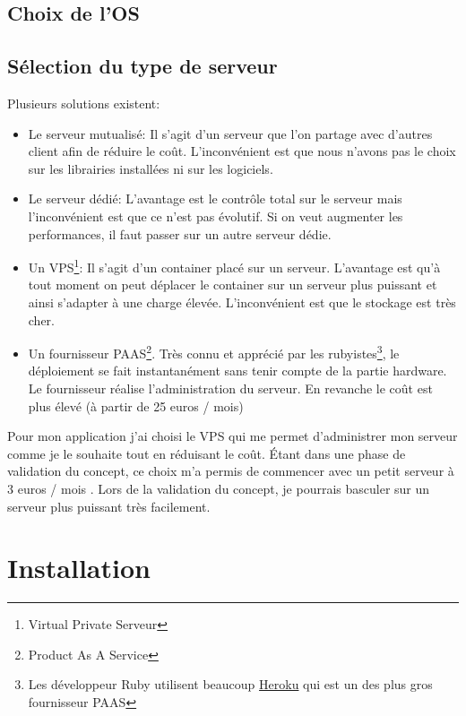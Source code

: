 \documentclass[]{report}
\begin{document}
    \subsection{Choix de l'OS}

    \subsection{Sélection du type de serveur}

      Plusieurs solutions existent:

      \begin{itemize}
        \item Le serveur mutualisé: Il s’agit d’un serveur que l’on partage avec d’autres client afin de réduire le coût. L’inconvénient est que nous n’avons pas le choix sur les librairies installées ni sur les logiciels.
        \item Le serveur dédié: L’avantage est le contrôle total sur le serveur mais l’inconvénient est que ce n’est pas évolutif. Si on veut augmenter les performances, il faut passer sur un autre serveur dédie.
        \item Un VPS\footnote{Virtual Private Serveur}: Il s’agit d’un container placé sur un serveur. L’avantage est qu’à tout moment on peut déplacer le container sur un serveur plus puissant et ainsi s’adapter à une charge élevée. L’inconvénient est que le stockage est très cher.
        \item Un fournisseur PAAS\footnote{Product As A Service}. Très connu et apprécié par les rubyistes\footnote{Les développeur Ruby utilisent beaucoup  \href{https://www.heroku.com}{Heroku} qui est un des plus gros fournisseur PAAS}, le déploiement se fait instantanément sans tenir compte de la partie hardware.  Le fournisseur réalise l’administration du serveur. En revanche le coût est plus élevé (à partir de 25 euros / mois)
      \end{itemize}

      Pour mon application j’ai choisi le VPS qui me permet d’administrer mon serveur comme je le souhaite tout en réduisant le coût. Étant dans une phase de validation du concept, ce choix m’a permis de commencer avec un petit serveur à 3 euros / mois . Lors de la validation du concept, je pourrais basculer sur un serveur plus puissant très facilement.

  \section{Installation}
\end{document}

